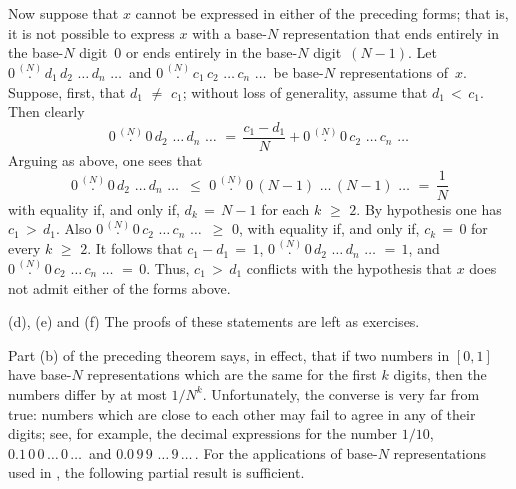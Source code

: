         Now suppose that $x$ cannot be expressed in either of the preceding forms;
    that is, it is not possible to express $x$ with a base-$N$ representation that ends
    entirely in the base-$N$ digit~$0$ or ends entirely in the base-$N$ digit~$(N-1)$.
    Let $0\,\stackrel{(N)}{.}\,d_{1}\,d_{2}\,\,{\ldots}\,d_{n}\,\,{\ldots}\,$ and $0\,\stackrel{(N)}{.}\,c_{1}\,c_{2}\,\,{\ldots}\,c_{n}\,\,{\ldots}\,$ be 
    base-$N$ representations of~$x$. Suppose, first, that $d_{1} \,\,{\neq}\,\, c_{1}$; without loss of generality, assume that $d_{1}\,<\,c_{1}$.
    Then clearly
        \begin{displaymath}
        0\,\stackrel{(N)}{.}\,0\,d_{2}\,\,{\ldots}\,d_{n}\,\,{\ldots}\,
     \,=\, 
        \frac{c_{1}-d_{1}}{N} +
        0\,\stackrel{(N)}{.}\,0\,c_{2}\,\,{\ldots}\,c_{n}\,\,{\ldots}\,
        \end{displaymath}
    Arguing as above, one sees that
        \begin{displaymath}
        0\,\stackrel{(N)}{.}\,0\,d_{2}\,\,{\ldots}\,d_{n}\,\,{\ldots}\,
    \,\,{\leq}\,\,
        0\,\stackrel{(N)}{.}\,0\,(N-1)\,\,{\ldots}\,(N-1)\,\,{\ldots}\,
     \,=\, \frac{1}{N}
        \end{displaymath}
    with equality if, and only if, $d_{k} \,=\, N-1$ for each $k\,\,{\geq}\,\,2$.
    By hypothesis one has $c_{1}\,>\,d_{1}$. Also $0\,\stackrel{(N)}{.}\,0\,c_{2}\,\,{\ldots}\,c_{n}\,\,{\ldots}\,
    \,\,{\geq}\,\,0$, with equality if, and only if, $c_{k} \,=\, 0$ for every $k\,\,{\geq}\,\,2$.
    It follows that $c_{1}-d_{1} \,=\, 1$, $0\,\stackrel{(N)}{.}\,0\,d_{2}\,\,{\ldots}\,d_{n}\,\,{\ldots}\, \,=\, 1$,
    and $0\,\stackrel{(N)}{.}\,0\,c_{2}\,\,{\ldots}\,c_{n}\,\,{\ldots}\, \,=\, 0$.
    Thus, $c_{1}\,>\,d_{1}$ conflicts with the hypothesis that $x$ does not admit either of the forms above.

\V

        (d), (e) and (f) The proofs of these statements are left as exercises.


\VV

        Part (b) of the preceding theorem says, in effect, that if two numbers in $[0,1]$ have
    base-$N$ representations which are the same for the first $k$ digits, then the numbers differ by at most $1/N^{k}$.
    Unfortunately, the converse is very far from true: numbers which are close to each other may fail to agree in any of their digits;
    see, for example, the decimal expressions for the number $1/10$,
    $0.1\,0\,0\,{\ldots}\,0\,{\ldots}\,$ and $0.0\,9\,9\,\,{\ldots}\,9\,{\ldots}\,$.
    For the applications of base-$N$ representations used in {\ThisText}, the following partial result is sufficient.

